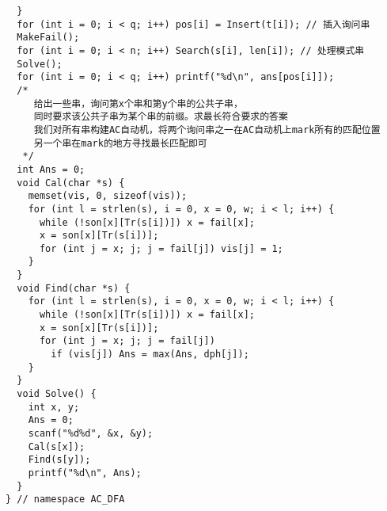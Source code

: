 \begin{lstlisting}
  }
  for (int i = 0; i < q; i++) pos[i] = Insert(t[i]); // 插入询问串
  MakeFail();
  for (int i = 0; i < n; i++) Search(s[i], len[i]); // 处理模式串
  Solve();
  for (int i = 0; i < q; i++) printf("%d\n", ans[pos[i]]);
  /*
     给出一些串，询问第x个串和第y个串的公共子串，
     同时要求该公共子串为某个串的前缀。求最长符合要求的答案
     我们对所有串构建AC自动机，将两个询问串之一在AC自动机上mark所有的匹配位置
     另一个串在mark的地方寻找最长匹配即可
   */
  int Ans = 0;
  void Cal(char *s) {
    memset(vis, 0, sizeof(vis));
    for (int l = strlen(s), i = 0, x = 0, w; i < l; i++) {
      while (!son[x][Tr(s[i])]) x = fail[x];
      x = son[x][Tr(s[i])];
      for (int j = x; j; j = fail[j]) vis[j] = 1;
    }
  }
  void Find(char *s) {
    for (int l = strlen(s), i = 0, x = 0, w; i < l; i++) {
      while (!son[x][Tr(s[i])]) x = fail[x];
      x = son[x][Tr(s[i])];
      for (int j = x; j; j = fail[j])
        if (vis[j]) Ans = max(Ans, dph[j]);
    }
  }
  void Solve() {
    int x, y;
    Ans = 0;
    scanf("%d%d", &x, &y);
    Cal(s[x]);
    Find(s[y]);
    printf("%d\n", Ans);
  }
} // namespace AC_DFA
\end{lstlisting}
